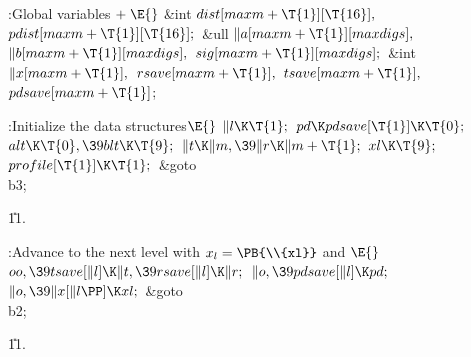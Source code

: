 \fi

\B{}:Global variables\X${}\mathrel+\E{}$\6
\&{int} ${}\\{dist}[\\{maxm}+\T{1}][\T{16}],{}$ ${}\\{pdist}[\\{maxm}+\T{1}][%
\T{16}];{}$\6
\&{ull} ${}\|a[\\{maxm}+\T{1}][\\{maxdigs}],{}$ ${}\|b[\\{maxm}+\T{1}][%
\\{maxdigs}],{}$ ${}\\{sig}[\\{maxm}+\T{1}][\\{maxdigs}];{}$\6
\&{int} ${}\|x[\\{maxm}+\T{1}],{}$ ${}\\{rsave}[\\{maxm}+\T{1}],{}$ ${}%
\\{tsave}[\\{maxm}+\T{1}],{}$ ${}\\{pdsave}[\\{maxm}+\T{1}]{}$;\par
\fi

\B{}:Initialize the data structures\X${}\E{}$\6
$\|l\K\T{1};{}$\6
${}\\{pd}\K\\{pdsave}[\T{1}]\K\T{0};{}$\6
${}\\{alt}\K\T{0},\39\\{blt}\K\T{9};{}$\6
${}\|t\K\|m,\39\|r\K\|m+\T{1};{}$\6
${}\\{xl}\K\T{9};{}$\6
${}\\{profile}[\T{1}]\K\T{1};{}$\6
\&{goto} \\{b3};%
\par
\U11.\fi

\B{}:Advance to the next level with $x_l=\PB{\\{xl}}$ and \X${}\E{}$\6
$\\{oo},\39\\{tsave}[\|l]\K\|t,\39\\{rsave}[\|l]\K\|r;{}$\6
${}\|o,\39\\{pdsave}[\|l]\K\\{pd};{}$\6
${}\|o,\39\|x[\|l\PP]\K\\{xl};{}$\6
\&{goto} \\{b2};\par
\U11.\fi

